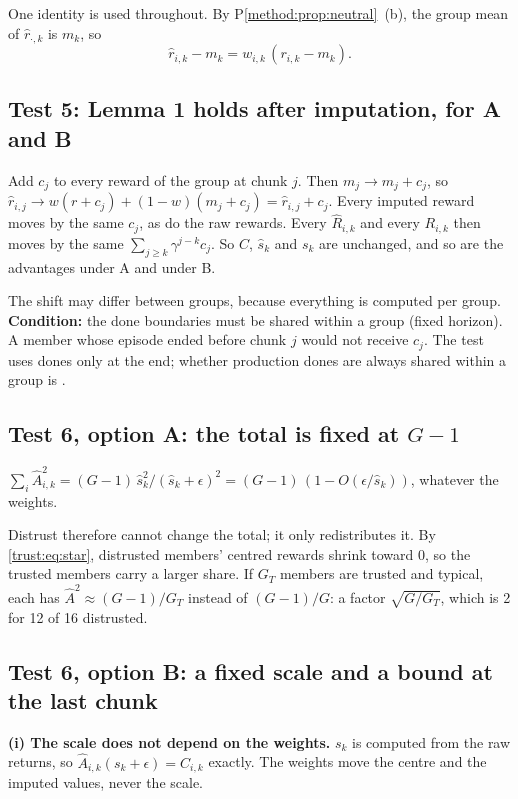 One identity is used throughout. By P\ref{method:prop:neutral}~(b), the group mean of
$\hat r_{\cdot,k}$ is $m_k$, so
\begin{equation*}
\hat r_{i,k}-m_k=w_{i,k}\,(r_{i,k}-m_k).\tag{$*$}\label{trust:eq:star}
\end{equation*}

\subsection{Test 5: Lemma 1 holds after imputation, for A and B}

Add $c_j$ to every reward of the group at chunk $j$. Then $m_j\to m_j+c_j$, so
$\hat r_{i,j}\to w(r+c_j)+(1-w)(m_j+c_j)=\hat r_{i,j}+c_j$. Every imputed reward moves by the same
$c_j$, as do the raw rewards. Every $\hat R_{i,k}$ and every $R_{i,k}$ then moves by the same
$\sum_{j\ge k}\gamma^{j-k}c_j$. So $C$, $\hat s_k$ and $s_k$ are unchanged, and so are the advantages
under A and under B.

The shift may differ between groups, because everything is computed per group.
\textbf{Condition:} the done boundaries must be shared within a group (fixed horizon). A member
whose episode ended before chunk $j$ would not receive $c_j$. The test uses dones only at the end;
whether production dones are always shared within a group is \chk.

\subsection{Test 6, option A: the total is fixed at \texorpdfstring{$G-1$}{G-1}}

$\sum_i \hat A_{i,k}^2=(G-1)\,\hat s_k^2/(\hat s_k+\epsilon)^2=(G-1)\,(1-O(\epsilon/\hat s_k))$,
whatever the weights.

Distrust therefore cannot change the total; it only redistributes it. By \eqref{trust:eq:star},
distrusted members' centred rewards shrink toward 0, so the trusted members carry a larger share.
If $G_T$ members are trusted and typical, each has $\hat A^2\approx (G-1)/G_T$ instead of
$(G-1)/G$: a factor $\sqrt{G/G_T}$, which is 2 for 12 of 16 distrusted.

\subsection{Test 6, option B: a fixed scale and a bound at the last chunk}

\textbf{(i) The scale does not depend on the weights.} $s_k$ is computed from the raw returns, so
$\hat A_{i,k}(s_k+\epsilon)=C_{i,k}$ exactly. The weights move the centre and the imputed values,
never the scale.

